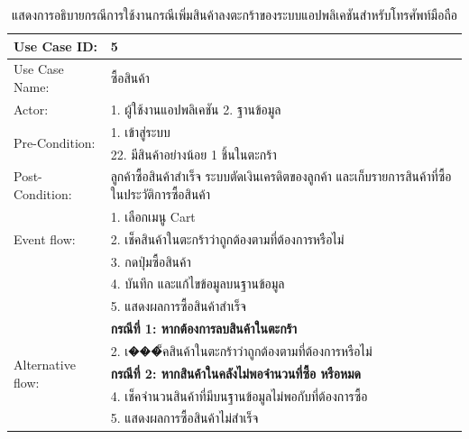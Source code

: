 \begin{table}[htbp]
  \centering
  \caption{แสดงการอธิบายกรณีการใช้งานกรณีเพิ่มสินค้าลงตะกร้าของระบบแอปพลิเคชันสำหรับโทรศัพท์มือถือ}
  \label{tab:example}
  \begin{tabularx}{\textwidth}{|p{3cm}|X|}
    \hline
    \multirow{1}{3cm}{Use Case ID:}      & 5                                                                        \\
    \hline
    \multirow{1}{3cm}{Use Case Name:}    & ซื้อสินค้า                                                                   \\
    \hline
    \multirow{1}{3cm}{Actor:}            & 1. ผู้ใช้งานแอปพลิเคชัน 2. ฐานข้อมูล                                            \\
    \hline
    \multirow{2}{3cm}{Pre-Condition:}    & 1. เข้าสู่ระบบ                                                              \\ & 22. มีสินค้าอย่างน้อย 1 ชิ้นในตะกร้า \\
    \hline
    \multirow{1}{3cm}{Post-Condition:}   & ลูกค้าซื้อสินค้าสำเร็จ ระบบตัดเงินเครดิตของลูกค้า และเก็บรายการสินค้าที่ซื้อในประวัติการซื้อสินค้า \\
    \hline
    \multirow{3}{3cm}{Event flow:}       & 1. เลือกเมนู Cart                                                          \\
                                         & 2. เช็คสินค้าในตะกร้าว่าถูกต้องตามที่ต้องการหรือไม่                                  \\ & 3. กดปุ่มซื้อสินค้า \\
                                         & 4. บันทึก และแก้ไขข้อมูลบนฐานข้อมูล                                             \\ & 5. แสดงผลการซื้อสินค้าสำเร็จ \\
    \hline
    \multirow{5}{3cm}{Alternative flow:} & \textbf{กรณีที่ 1: หากต้องการลบสินค้าในตะกร้า}                                  \\
                                         & 2. เ���็คสินค้าในตะกร้าว่าถูกต้องตามที่ต้องการหรือไม่                                  \\ & \textbf{กรณีที่ 2: หากสินค้าในคลังไม่พอจำนวนที่ซื้อ หรือหมด} \\
                                         & 4. เช็คจำนวนสินค้าที่มีบนฐานข้อมูลไม่พอกับที่ต้องการซื้อ                                 \\ & 5. แสดงผลการซื้อสินค้าไม่สำเร็จ \\
    \hline
  \end{tabularx}
\end{table}


